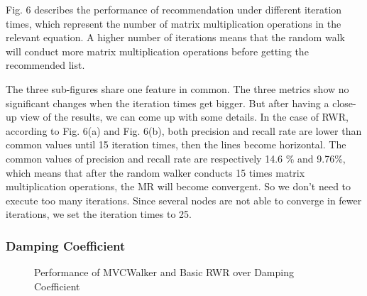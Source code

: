 \documentclass[10pt,journal,compsoc]{IEEEtran}
\begin{document}
Fig. 6 describes the performance of recommendation under different iteration times, which represent the number of matrix multiplication operations in the relevant equation. A higher number of iterations means that the random walk will conduct more matrix multiplication operations before getting the recommended list.

The three sub-figures share one feature in common. The three metrics show no significant changes when the iteration times get bigger. But after having a close-up view of the results, we can come up with some details. In the case of RWR, according to Fig. 6(a) and Fig. 6(b), both precision and recall rate are lower than common values until 15 iteration times, then the lines become horizontal. The common values of precision and recall rate are respectively 14.6 \% and 9.76\%, which means that after the random walker conducts 15 times matrix multiplication operations, the MR will become convergent. So we don't need to execute too many iterations. Since several nodes are not able to converge in fewer iterations, we set the iteration times to 25.

\subsubsection{Damping Coefficient}

\begin{figure}
\centering
{}
\caption{Performance of MVCWalker and Basic RWR over Damping Coefficient}
\label{fig:7}       %
\end{figure}
\end{document}
